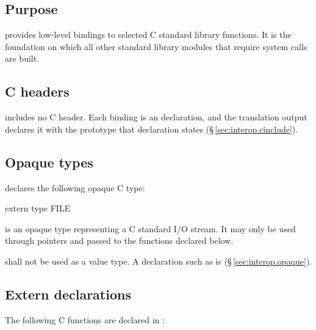 \subsection{Purpose}
\label{sec:stdlib.c.purpose}

\pnum
{} provides low-level bindings to selected C standard library
functions.  It is the foundation on which all other standard library
modules that require system calls are built.

\subsection{C headers}
\label{sec:stdlib.c.headers}

\pnum
{} includes no C header.  Each binding is an  declaration,
and the translation output declares it with the prototype that declaration states
(\S\,\ref{sec:interop.cinclude}).

\subsection{Opaque types}
\label{sec:stdlib.c.types}

\pnum
{} declares the following opaque C type:

\begin{laincode}
extern type FILE
\end{laincode}

 is an opaque type representing a C standard I/O stream.  It
may only be used through pointers and passed to the 
functions declared below.

\begin{constraint}
   shall not be used as a value type.  A declaration such as
   is \illformed{} (\S\,\ref{sec:interop.opaque}).
\end{constraint}

\subsection{Extern declarations}
\label{sec:stdlib.c.extern}

\pnum
The following C functions are declared in :

